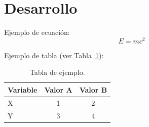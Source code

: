 \section{Desarrollo}
\label{sec:desarrollo}

Ejemplo de ecuación:
\begin{equation}
  E = mc^2
  \label{eq:einstein}
\end{equation}

Ejemplo de tabla (ver Tabla~\ref{tab:ejemplo}):
\begin{table}[h]
  \centering
  \begin{tabular}{lcc}
    \toprule
    Variable & Valor A & Valor B \\
    \midrule
    X & 1 & 2 \\
    Y & 3 & 4 \\
    \bottomrule
  \end{tabular}
  \caption{Tabla de ejemplo.}
  \label{tab:ejemplo}
\end{table}

